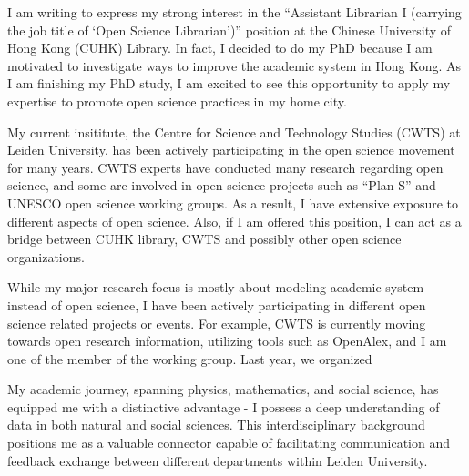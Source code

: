 \documentclass[11pt, a4paper]{awesome-cv}
\begin{document}
\makecvheader[R]

\makecvfooter
  {}%
  {}%
  {}

\makelettertitle

\begin{cvletter}

I am writing to express my strong interest in the “Assistant Librarian I (carrying the job title of ‘Open Science Librarian’)” position at the Chinese University of Hong Kong (CUHK) Library. In fact, I decided to do my PhD because I am motivated to investigate ways to improve the academic system in Hong Kong. As I am finishing my PhD study, I am excited to see this opportunity to apply my expertise to promote open science practices in my home city.

My current insititute, the Centre for Science and Technology Studies (CWTS) at Leiden University, has been actively participating in the open science movement for many years. CWTS experts have conducted many research regarding open science, and some are involved in open science projects such as ``Plan S'' and UNESCO open science working groups. As a result, I have extensive exposure to different aspects of open science. Also, if I am offered this position, I can act as a bridge between CUHK library, CWTS and possibly other open science organizations.

While my major research focus is mostly about modeling academic system instead of open science, I have been actively participating in different open science related projects or events. For example, CWTS is currently moving towards open research information, utilizing tools such as OpenAlex, and I am one of the member of the working group. Last year, we organized

My academic journey, spanning physics, mathematics, and social science, has equipped me with a distinctive advantage - I possess a deep understanding of data in both natural and social sciences. This interdisciplinary background positions me as a valuable connector capable of facilitating communication and feedback exchange between different departments within Leiden University.


\end{cvletter}
\end{document}
